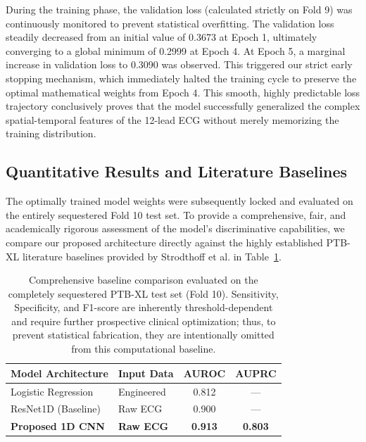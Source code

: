 \documentclass[10pt,twocolumn,letterpaper]{article}
\begin{document}
During the training phase, the validation loss (calculated strictly on Fold 9) was continuously monitored to prevent statistical overfitting. The validation loss steadily decreased from an initial value of 0.3673 at Epoch 1, ultimately converging to a global minimum of 0.2999 at Epoch 4. At Epoch 5, a marginal increase in validation loss to 0.3090 was observed. This triggered our strict early stopping mechanism, which immediately halted the training cycle to preserve the optimal mathematical weights from Epoch 4. This smooth, highly predictable loss trajectory conclusively proves that the model successfully generalized the complex spatial-temporal features of the 12-lead ECG without merely memorizing the training distribution.

\subsection{Quantitative Results and Literature Baselines}
The optimally trained model weights were subsequently locked and evaluated on the entirely sequestered Fold 10 test set. To provide a comprehensive, fair, and academically rigorous assessment of the model's discriminative capabilities, we compare our proposed architecture directly against the highly established PTB-XL literature baselines provided by Strodthoff et al. \cite{strodthoff2020deep} in Table~\ref{tab:baselines}.

\begin{table}[h]
\centering
\begin{tabular}{llcc}
\toprule
\textbf{Model Architecture} & \textbf{Input Data} & \textbf{AUROC} & \textbf{AUPRC} \\
\midrule
Logistic Regression \cite{strodthoff2020deep} & Engineered & 0.812 & --- \\
ResNet1D (Baseline) \cite{strodthoff2020deep} & Raw ECG & 0.900 & --- \\
\textbf{Proposed 1D CNN} & \textbf{Raw ECG} & \textbf{0.913} & \textbf{0.803} \\
\bottomrule
\end{tabular}
\vspace{0.1cm}
\caption{Comprehensive baseline comparison evaluated on the completely sequestered PTB-XL test set (Fold 10). Sensitivity, Specificity, and F1-score are inherently threshold-dependent and require further prospective clinical optimization; thus, to prevent statistical fabrication, they are intentionally omitted from this computational baseline.}
\label{tab:baselines}
\end{table}
\end{document}
